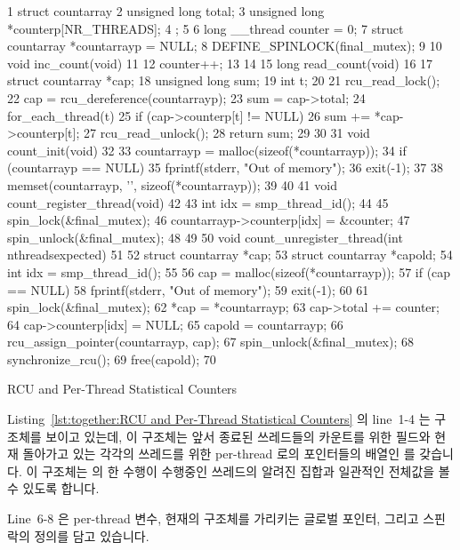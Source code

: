 \begin{listing}[bp]
{ \scriptsize
\begin{verbbox}
  1 struct countarray {
  2   unsigned long total;
  3   unsigned long *counterp[NR_THREADS];
  4 };
  5 
  6 long __thread counter = 0;
  7 struct countarray *countarrayp = NULL;
  8 DEFINE_SPINLOCK(final_mutex);
  9 
 10 void inc_count(void)
 11 {
 12   counter++;
 13 }
 14 
 15 long read_count(void)
 16 {
 17   struct countarray *cap;
 18   unsigned long sum;
 19   int t;
 20 
 21   rcu_read_lock();
 22   cap = rcu_dereference(countarrayp);
 23   sum = cap->total;
 24   for_each_thread(t)
 25     if (cap->counterp[t] != NULL)
 26       sum += *cap->counterp[t];
 27   rcu_read_unlock();
 28   return sum;
 29 }
 30 
 31 void count_init(void)
 32 {
 33   countarrayp = malloc(sizeof(*countarrayp));
 34   if (countarrayp == NULL) {
 35     fprintf(stderr, "Out of memory\n");
 36     exit(-1);
 37   }
 38   memset(countarrayp, '\0', sizeof(*countarrayp));
 39 }
 40 
 41 void count_register_thread(void)
 42 {
 43   int idx = smp_thread_id();
 44 
 45   spin_lock(&final_mutex);
 46   countarrayp->counterp[idx] = &counter;
 47   spin_unlock(&final_mutex);
 48 }
 49 
 50 void count_unregister_thread(int nthreadsexpected)
 51 {
 52   struct countarray *cap;
 53   struct countarray *capold;
 54   int idx = smp_thread_id();
 55 
 56   cap = malloc(sizeof(*countarrayp));
 57   if (cap == NULL) {
 58     fprintf(stderr, "Out of memory\n");
 59     exit(-1);
 60   }
 61   spin_lock(&final_mutex);
 62   *cap = *countarrayp;
 63   cap->total += counter;
 64   cap->counterp[idx] = NULL;
 65   capold = countarrayp;
 66   rcu_assign_pointer(countarrayp, cap);
 67   spin_unlock(&final_mutex);
 68   synchronize_rcu();
 69   free(capold);
 70 }
\end{verbbox}
}
\centering
\theverbbox
\caption{RCU and Per-Thread Statistical Counters}
\label{lst:together:RCU and Per-Thread Statistical Counters}
\end{listing}

Listing~\ref{lst:together:RCU and Per-Thread Statistical Counters}
의 line~1-4 는  구조체를 보이고 있는데, 이 구조체는 앞서 종료된
쓰레드들의 카운트를 위한  필드와 현재 돌아가고 있는 각각의 쓰레드를
위한 per-thread  로의 포인터들의 배열인  를
갖습니다.
이 구조체는  의 한 수행이 수행중인 쓰레드의 알려진 집합과
일관적인 전체값을 볼 수 있도록 합니다.

Line~6-8 은 per-thread  변수, 현재의  구조체를
가리키는  글로벌 포인터, 그리고  스핀락의
정의를 담고 있습니다.

